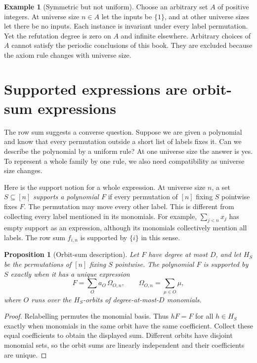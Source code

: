\documentclass[11pt,a4paper,oneside,openany]{book}
\newtheorem{proposition}[theorem]{Proposition}
\theoremstyle{definition}\newtheorem{definition}[theorem]{Definition}
\newtheorem{example}[theorem]{Example}
\theoremstyle{remark}\newtheorem{remark}[theorem]{Remark}
\numberwithin{equation}{chapter}
\begin{document}
\begin{example}[Symmetric but not uniform]\label{tx:eg:not-uniform}
Choose an arbitrary set $A$ of positive integers. At universe size $n\in A$
let the inputs be $\{1\}$, and at other universe sizes let there be no inputs.
Each instance is invariant under every label permutation. Yet the
refutation degree is zero on $A$ and infinite elsewhere. Arbitrary
choices of $A$ cannot satisfy the periodic conclusions of this book.
They are excluded because the axiom rule changes with universe size.
\end{example}

\section{Supported expressions are orbit-sum expressions}\label{tx:sec:supported-expressions}
The row sum suggests a converse question. Suppose we are given a
polynomial and know that every permutation outside a short list of
labels fixes it. Can we describe the polynomial by a uniform rule?
At one universe size the answer is yes. To represent a whole family by one
rule, we also need compatibility as universe size changes.

Here is the support notion for a whole expression. At universe size $n$, a set
$S\subseteq[n]$ \emph{supports a polynomial $F$} if every permutation
of $[n]$ fixing $S$ pointwise fixes $F$. The permutation may move every
other label. This is different from collecting every label mentioned
in its monomials. For example, $\sum_{j<n}x_j$ has empty support as an
expression, although its monomials collectively mention all labels.
The row sum $f_{i,n}$ is supported by $\{i\}$ in this sense.

\begin{proposition}[Orbit-sum description]\label{tx:prop:orbit-sum}
Let $F$ have degree at most $D$, and let $H_S$ be the permutations of
$[n]$ fixing $S$ pointwise. The polynomial $F$ is supported by $S$
exactly when it has a unique expression
\[
             F=\sum_O a_O\,\Omega_{O,n},\qquad
             \Omega_{O,n}=\sum_{\mu\in O}\mu,
\]
where $O$ runs over the $H_S$-orbits of degree-at-most-$D$ monomials.
\end{proposition}
\begin{proof}
Relabelling permutes the monomial basis. Thus $hF=F$ for all $h\in H_S$
exactly when monomials in the same orbit have the same coefficient.
Collect these equal coefficients to obtain the displayed sum.
Different orbits have disjoint monomial sets, so the orbit sums are
linearly independent and their coefficients are unique.
\end{proof}
\end{document}
